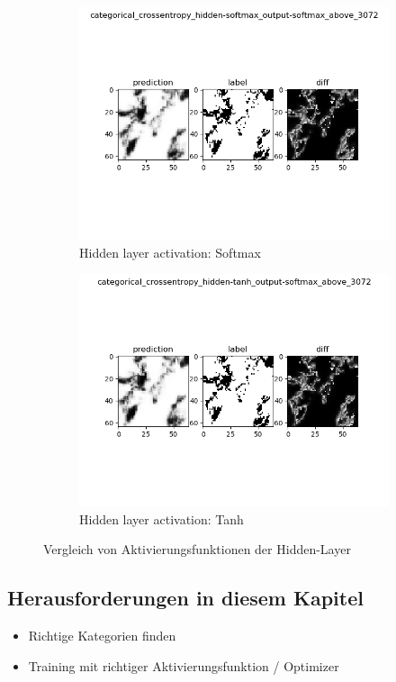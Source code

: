 \begin{figure}[ht]
\centering
\begin{subfigure}{0.5\textwidth}
\centering
\includegraphics[width=\linewidth]{pics/categorical_crossentropy_hidden-softmax_output-softmax_above_3072}
\caption{Hidden layer activation: Softmax}
\label{fig:hiddenActivationSoftmax}
\end{subfigure}%
\begin{subfigure}{0.5\textwidth}
\centering
\includegraphics[width=\linewidth]{pics/categorical_crossentropy_hidden-tanh_output-softmax_above_3072}
\caption{Hidden layer activation: Tanh}
\label{fig:hiddenActivationTanh}
\end{subfigure}%
\caption{Vergleich von Aktivierungsfunktionen der Hidden-Layer}
\label{fig:activatinHidden}
\end{figure}

\subsection{Herausforderungen in diesem Kapitel}
\begin{itemize}
\item Richtige Kategorien finden
\item Training mit richtiger Aktivierungsfunktion / Optimizer
\end{itemize}
